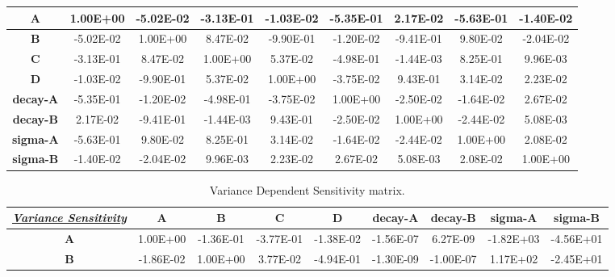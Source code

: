 \begin{landscape}
\begin{table}[h!]
\begin{tabular}{|c|c|c|c|c|c|c|c|c|}
\textbf{A}                          & 1.00E+00   & -5.02E-02  & -3.13E-01  & -1.03E-02  & -5.35E-01        & 2.17E-02         & -5.63E-01        & -1.40E-02        \\ \hline
\textbf{B}                          & -5.02E-02  & 1.00E+00   & 8.47E-02   & -9.90E-01  & -1.20E-02        & -9.41E-01        & 9.80E-02         & -2.04E-02        \\ \hline
\textbf{C}                          & -3.13E-01  & 8.47E-02   & 1.00E+00   & 5.37E-02   & -4.98E-01        & -1.44E-03        & 8.25E-01         & 9.96E-03         \\ \hline
\textbf{D}                          & -1.03E-02  & -9.90E-01  & 5.37E-02   & 1.00E+00   & -3.75E-02        & 9.43E-01         & 3.14E-02         & 2.23E-02         \\ \hline
\textbf{decay-A}                    & -5.35E-01  & -1.20E-02  & -4.98E-01  & -3.75E-02  & 1.00E+00         & -2.50E-02        & -1.64E-02        & 2.67E-02         \\ \hline
\textbf{decay-B}                    & 2.17E-02   & -9.41E-01  & -1.44E-03  & 9.43E-01   & -2.50E-02        & 1.00E+00         & -2.44E-02        & 5.08E-03         \\ \hline
\textbf{sigma-A}                    & -5.63E-01  & 9.80E-02   & 8.25E-01   & 3.14E-02   & -1.64E-02        & -2.44E-02        & 1.00E+00         & 2.08E-02         \\ \hline
\textbf{sigma-B}                    & -1.40E-02  & -2.04E-02  & 9.96E-03   & 2.23E-02   & 2.67E-02         & 5.08E-03         & 2.08E-02         & 1.00E+00         \\ \hline
\end{tabular}
\end{table}
\begin{table}[h!]
\centering
\caption{Variance Dependent Sensitivity matrix.}
\label{VarDepSensitivityComputed}
\begin{tabular}{|c|c|c|c|c|c|c|c|c|}
\hline
{\ul \textit{\textbf{Variance Sensitivity}}} & \textbf{A} & \textbf{B} & \textbf{C} & \textbf{D} & \textbf{decay-A} & \textbf{decay-B} & \textbf{sigma-A} & \textbf{sigma-B} \\ \hline
\textbf{A}                                   & 1.00E+00   & -1.36E-01  & -3.77E-01  & -1.38E-02  & -1.56E-07        & 6.27E-09         & -1.82E+03        & -4.56E+01        \\ \hline
\textbf{B}                                   & -1.86E-02  & 1.00E+00   & 3.77E-02   & -4.94E-01  & -1.30E-09        & -1.00E-07        & 1.17E+02         & -2.45E+01        \\ \hline

\end{tabular}
\end{table}
\end{landscape}
